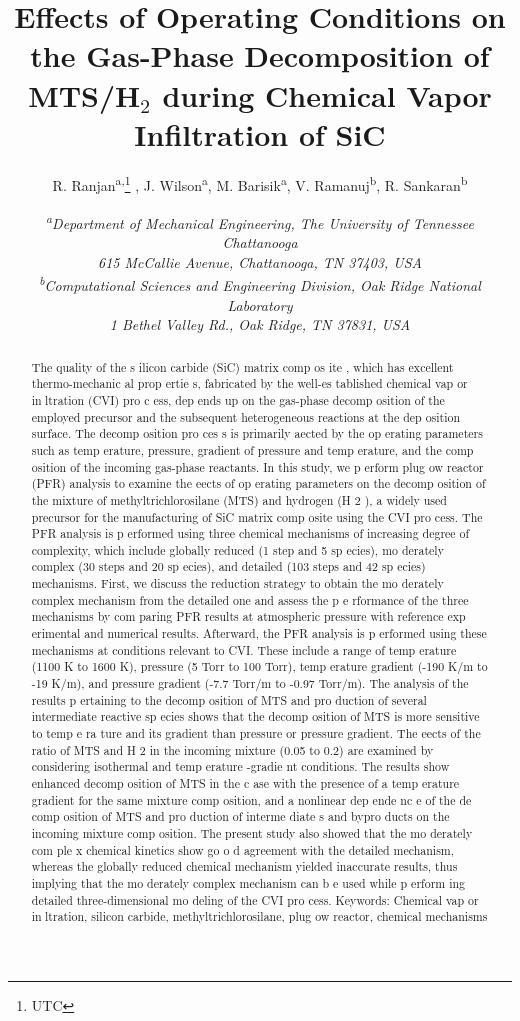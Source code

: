 \documentclass[12pt, letterpaper]{article}
\title{\large Effects of Operating Conditions on the Gas-Phase Decomposition of \\
MTS/H$_2$ during Chemical Vapor Infiltration of SiC}
\author{
    {\small
        R. Ranjan\textsuperscript{a,}\thanks{UTC} ,
        J. Wilson\textsuperscript{a},
        M. Barisik\textsuperscript{a},
        V. Ramanuj\textsuperscript{b},
        R. Sankaran\textsuperscript{b}
        }
    }
\date{
    \scriptsize \emph{
        \textsuperscript{a}Department of Mechanical Engineering, The University of Tennessee Chattanooga \\
        615 McCallie Avenue, Chattanooga, TN 37403, USA \\
        \textsuperscript{b}Computational Sciences and Engineering Division, Oak Ridge National Laboratory \\
        1 Bethel Valley Rd., Oak Ridge, TN 37831, USA \\
    }
    }
\begin{document}
\maketitle
\begin{abstract}
The quality of the s ilicon carbide (SiC) matrix comp os ite , which has excellent thermo-mechanic al prop ertie s,
fabricated by the well-es tablished chemical vap or inltration (CVI) pro c ess, dep ends up on the gas-phase
decomp osition of the employed precursor and the subsequent heterogeneous reactions at the dep osition
surface. The decomp osition pro ces s is primarily aected by the op erating parameters such as temp erature,
pressure, gradient of pressure and temp erature, and the comp osition of the incoming gas-phase reactants. In
this study, we p erform plug 
ow reactor (PFR) analysis to examine the eects of op erating parameters on the
decomp osition of the mixture of methyltrichlorosilane (MTS) and hydrogen (H
2
), a widely used precursor
for the manufacturing of SiC matrix comp osite using the CVI pro cess. The PFR analysis is p erformed using
three chemical mechanisms of increasing degree of complexity, which include globally reduced (1 step and 5
sp ecies), mo derately complex (30 steps and 20 sp ecies), and detailed (103 steps and 42 sp ecies) mechanisms.
First, we discuss the reduction strategy to obtain the mo derately complex mechanism from the detailed
one and assess the p e rformance of the three mechanisms by com paring PFR results at atmospheric pressure
with reference exp erimental and numerical results. Afterward, the PFR analysis is p erformed using these
mechanisms at conditions relevant to CVI. These include a range of temp erature (1100 K to 1600 K), pressure
(5 Torr to 100 Torr), temp erature gradient (-190 K/m to -19 K/m), and pressure gradient (-7.7 Torr/m to
-0.97 Torr/m). The analysis of the results p ertaining to the decomp osition of MTS and pro duction of several
intermediate reactive sp ecies shows that the decomp osition of MTS is more sensitive to temp e ra ture and
its gradient than pressure or pressure gradient. The eects of the ratio of MTS and H
2
in the incoming
mixture (0.05 to 0.2) are examined by considering isothermal and temp erature -gradie nt conditions. The
results show enhanced decomp osition of MTS in the c ase with the presence of a temp erature gradient for
the same mixture comp osition, and a nonlinear dep ende nc e of the de comp osition of MTS and pro duction
of interme diate s and bypro ducts on the incoming mixture comp osition. The present study also showed that
the mo derately com ple x chemical kinetics show go o d agreement with the detailed mechanism, whereas the
globally reduced chemical mechanism yielded inaccurate results, thus implying that the mo derately complex
mechanism can b e used while p erform ing detailed three-dimensional mo deling of the CVI pro cess.
Keywords:
Chemical vap or inltration, silicon carbide, methyltrichlorosilane, plug 
ow reactor, chemical
mechanisms


\end{abstract}
\end{document}
